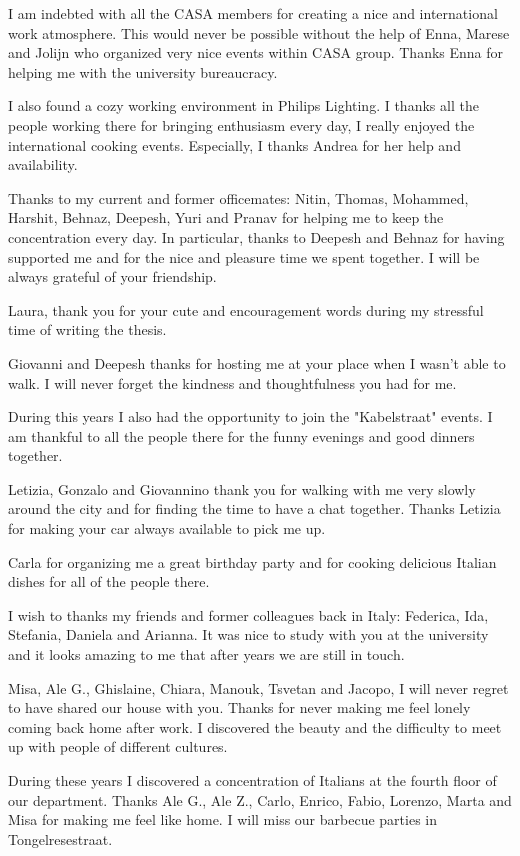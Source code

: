 I am indebted with all the CASA members for creating a nice and international work atmosphere. This would never be possible without the help of Enna, Marese and Jolijn who organized very nice events within CASA group. Thanks Enna for helping me with the university bureaucracy.

I also found a cozy working environment in Philips Lighting. I thanks all the people working there for bringing enthusiasm every day, I really enjoyed the international cooking events. Especially, I thanks Andrea for her help and availability.

Thanks to my current and former officemates: Nitin, Thomas, Mohammed, Harshit, Behnaz, Deepesh, Yuri and Pranav for helping me to keep the concentration every day.
In particular, thanks to Deepesh and Behnaz for having supported me and for the nice and pleasure time we spent together. I will be always grateful of your friendship. 

Laura, thank you for your cute and encouragement words during my stressful time of writing the thesis.

Giovanni and Deepesh thanks for hosting me at your place when I wasn't able to walk. I will never forget the kindness and thoughtfulness you had for me.

During this years I also had the opportunity to join the "Kabelstraat" events. I am thankful to all the people there for the funny evenings and good dinners together.

Letizia, Gonzalo and Giovannino thank you for walking with me very slowly around the city and for finding the time to have a chat together. Thanks Letizia for making your car always available to pick me up.

Carla for organizing me a great birthday party and for cooking delicious Italian dishes for all of the people there.

I wish to thanks my friends and former colleagues back in Italy: Federica, Ida, Stefania, Daniela and Arianna. It was nice to study with you at the university and it looks amazing to me that after years we are still in touch.

Misa, Ale G., Ghislaine, Chiara, Manouk, Tsvetan and Jacopo, I will never regret to have shared our house with you. Thanks for never making me feel lonely coming back home after work. I discovered the beauty and the difficulty to meet up with people of different cultures.

During these years I discovered a concentration of Italians at the fourth floor of our department. Thanks Ale G., Ale Z., Carlo, Enrico, Fabio, Lorenzo, Marta and Misa for making me feel like home. I will miss our barbecue parties in Tongelresestraat.

